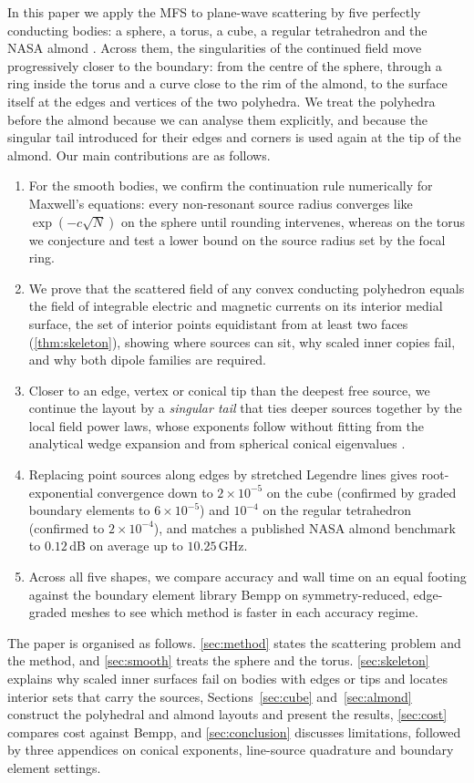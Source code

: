 In this paper we apply the MFS to plane-wave scattering by five perfectly conducting bodies: a sphere, a torus, a cube, a regular tetrahedron and the NASA almond \cite{woo1993}. Across them, the singularities of the continued field move progressively closer to the boundary: from the centre of the sphere, through a ring inside the torus and a curve close to the rim of the almond, to the surface itself at the edges and vertices of the two polyhedra. We treat the polyhedra before the almond because we can analyse them explicitly, and because the singular tail introduced for their edges and corners is used again at the tip of the almond. Our main contributions are as follows.
\begin{enumerate}
  \item For the smooth bodies, we confirm the continuation rule numerically for Maxwell's equations: every non-resonant source radius converges like $\exp(-c\sqrt{N})$ on the sphere until rounding intervenes, whereas on the torus we conjecture and test a lower bound on the source radius set by the focal ring.
  \item We prove that the scattered field of any convex conducting polyhedron equals the field of integrable electric and magnetic currents on its interior medial surface, the set of interior points equidistant from at least two faces (\autoref{thm:skeleton}), showing where sources can sit, why scaled inner copies fail, and why both dipole families are required.
  \item Closer to an edge, vertex or conical tip than the deepest free source, we continue the layout by a \emph{singular tail} that ties deeper sources together by the local field power laws, whose exponents follow without fitting from the analytical wedge expansion \cite{meixner1972} and from spherical conical eigenvalues \cite{desmedt1986}.
  \item Replacing point sources along edges by stretched Legendre lines gives root-exponential convergence down to $2\times10^{-5}$ on the cube (confirmed by graded boundary elements to $6\times10^{-5}$) and $10^{-4}$ on the regular tetrahedron (confirmed to $2\times10^{-4}$), and matches a published NASA almond benchmark \cite{kelley2020} to $0.12$\,dB on average up to $10.25$\,GHz.
  \item Across all five shapes, we compare accuracy and wall time on an equal footing against the boundary element library Bempp \cite{betcke2021} on symmetry-reduced, edge-graded meshes to see which method is faster in each accuracy regime.
\end{enumerate}

The paper is organised as follows. \autoref{sec:method} states the scattering problem and the method, and \autoref{sec:smooth} treats the sphere and the torus. \autoref{sec:skeleton} explains why scaled inner surfaces fail on bodies with edges or tips and locates interior sets that carry the sources, Sections~\ref{sec:cube} and~\ref{sec:almond} construct the polyhedral and almond layouts and present the results, \autoref{sec:cost} compares cost against Bempp, and \autoref{sec:conclusion} discusses limitations, followed by three appendices on conical exponents, line-source quadrature and boundary element settings.
